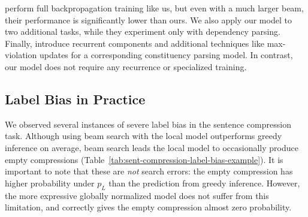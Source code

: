 \begin{table*}[t]
  \centering%
  \small
  \caption{\label{tab:sent-compression-label-bias-example}
    Example sentence compressions where the label bias of the locally normalized 
    model leads to a breakdown during beam search.
    The probability of each compression under the local ($p_L$) and global ($p_G$) models shows that only the global model can properly represent zero probability for the empty compression.
  }
\end{table*}


 perform full 
backpropagation training like us, 
but even with a much larger beam, their performance is significantly
lower than ours. We also apply our model to two additional tasks,
while they experiment only with dependency parsing.
Finally,  introduce recurrent
components and additional techniques like max-violation updates
for a corresponding constituency parsing model.
In contrast, our model does not require any recurrence
or specialized training.

\subsection{Label Bias in Practice}

We observed several instances of severe label bias in the sentence
compression task.  Although using beam search with the local model
outperforms greedy inference on average, beam search leads the local
model to occasionally produce empty compressions
(Table~\ref{tab:sent-compression-label-bias-example}).  It is important to
note that these are {\em not} search errors: the empty compression has
higher probability under $p_L$ than the prediction from greedy
inference. However, the more expressive globally normalized model
does not suffer from this limitation, and correctly gives the empty
compression almost zero probability.

